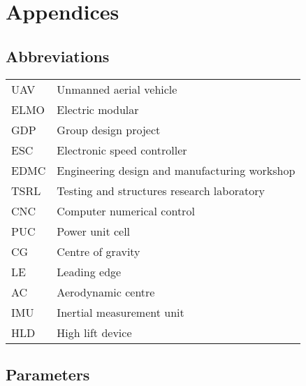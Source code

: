 \documentclass[../main.tex]{subfiles}
\newcommand{\appendixtable}[2]{
    \begin{table}[H]
        \begin{tabular}{#1}
            #2
        \end{tabular}
    \end{table}
}
\begin{document}
\chapter*{Appendices} \label{chapter:appendices}

\renewcommand{\thesection}{\Alph{section}}
\setcounter{section}{0}
\renewcommand*{\theHsection}{chX.\the\value{section}}

\section{Abbreviations} \label{appendix:abbreviations}

\appendixtable{l l}{
    UAV & Unmanned aerial vehicle \\
    ELMO & Electric modular \\
    GDP & Group design project \\
    ESC & Electronic speed controller \\
    EDMC & Engineering design and manufacturing workshop \\
    TSRL & Testing and structures research laboratory \\
    CNC & Computer numerical control \\
    PUC & Power unit cell \\
    CG & Centre of gravity \\
    LE & Leading edge \\
    AC & Aerodynamic centre \\
    IMU & Inertial measurement unit \\
    HLD & High lift device \\
}

\section{Parameters} \label{appendix:parameters}
\end{document}
